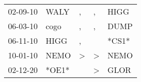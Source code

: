 \begin{supertabular}{lllll}
 02-09-10 &   WALY &             , &             , &   HIGG \\
 06-03-10 &   cogo &             , &             , &   DUMP \\
 06-11-10 &   HIGG &             , &               &  *CS1* \\
 10-01-10 &   NEMO &  \textgreater &  \textgreater &   NEMO \\
 02-12-20 &  *OE1* &               &  \textgreater &   GLOR \\
\end{supertabular}
